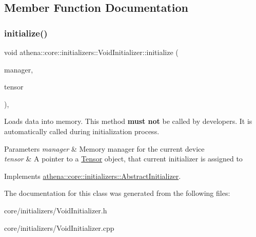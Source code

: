 \subsection{Member Function Documentation}
\mbox{\label{classathena_1_1core_1_1initializers_1_1_void_initializer_adcb637175e8cad5841cb21e53e0e138f}} 
\subsubsection{\texorpdfstring{initialize()}{initialize()}}
{\footnotesize\ttfamily void athena\+::core\+::initializers\+::\+Void\+Initializer\+::initialize (\begin{DoxyParamCaption}\item[{\mbox{\hyperlink{classathena_1_1backend_1_1_abstract_memory_manager}{athena\+::backend\+::\+Abstract\+Memory\+Manager}} $\ast$}]{manager,  }\item[{\mbox{\hyperlink{classathena_1_1core_1_1_tensor}{Tensor}} $\ast$}]{tensor }\end{DoxyParamCaption})\hspace{0.3cm}{\ttfamily [override]}, {\ttfamily [virtual]}}

Loads data into memory. This method {\bfseries must not} be called by developers. It is automatically called during initialization process. 
\begin{DoxyParams}{Parameters}
{\em manager} & Memory manager for the current device \\
\hline
{\em tensor} & A pointer to a \mbox{\hyperlink{classathena_1_1core_1_1_tensor}{Tensor}} object, that current initializer is assigned to \\
\hline
\end{DoxyParams}


Implements \mbox{\hyperlink{classathena_1_1core_1_1initializers_1_1_abstract_initializer_a9c0f0c57add306c9da8ffe8797532f62}{athena\+::core\+::initializers\+::\+Abstract\+Initializer}}.



The documentation for this class was generated from the following files\+:\begin{DoxyCompactItemize}
\item 
core/initializers/Void\+Initializer.\+h\item 
core/initializers/Void\+Initializer.\+cpp\end{DoxyCompactItemize}
